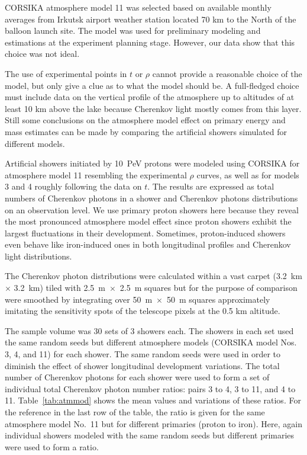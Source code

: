 \documentclass[universe,article,accept,moreauthors,pdftex]{Definitions/mdpi}
\begin{document}
CORSIKA atmosphere model 11 was selected based on available monthly averages from Irkutsk airport weather station located 70 km to the North of the balloon launch site. The model was used for preliminary modeling and estimations at the experiment planning stage. However, our data show that this choice was not ideal.

The use of experimental points in $t$ or $\rho$ cannot provide a reasonable choice of the model, but only give a clue as to what the model should be. A full-fledged choice must include data on the vertical profile of the atmosphere up to altitudes of at least 10 km above the lake because Cherenkov light mostly comes from this layer. Still some conclusions on the atmosphere model effect on primary energy and mass estimates can be made by comparing the artificial showers simulated for different models.

Artificial showers initiated by 10~PeV protons were modeled using CORSIKA for atmosphere model 11 resembling the experimental $\rho$ curves, as well as for models 3 and 4 roughly following the data on $t$. The results are expressed as total numbers of Cherenkov photons in a shower and Cherenkov photons distributions on an observation level. We use primary proton showers here because they reveal the most pronounced atmosphere model effect since proton showers exhibit the largest fluctuations in their development. Sometimes, proton-induced showers even behave like iron-induced ones in both longitudinal profiles and Cherenkov light distributions. 

The Cherenkov photon distributions were calculated within a vast carpet (3.2~km $\times$ 3.2~km) tiled with 2.5~m~$\times$~2.5~m squares but for the purpose of comparison were smoothed by integrating over 50~m~$\times$~50~m squares approximately imitating the sensitivity spots of the telescope pixels at the 0.5 km altitude.

The sample volume was 30 sets of 3 showers each. The showers in each set used the same random seeds but different atmosphere models (CORSIKA model Nos. 3, 4, and 11) for each shower. The same random seeds were used in order to diminish the effect of shower longitudinal development variations. The total number of Cherenkov photons for each shower were used to form a set of individual total Cherenkov photon number ratios: pairs 3 to 4, 3 to 11, and 4 to 11. Table~\ref{tab:atmmod} shows the mean values and variations of these ratios. For the reference in the last row of the table, the ratio is given for the same atmosphere model No.~11 but for different primaries (proton to iron). Here, again individual showers modeled with the same random seeds but different primaries were used to form a ratio. 
\end{document}
